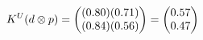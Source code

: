 \documentclass[preview]{standalone}
\begin{document}
\begin{align*}
\special{dvisvgm:raw <g id='unique000'>}K^U(d \otimes p) = \begin{pmatrix} (0.80)(0.71) \\ (0.84)(0.56) \end{pmatrix} = \begin{pmatrix} 0.57 \\ 0.47 \end{pmatrix}\special{dvisvgm:raw </g>}
\end{align*}
\end{document}
